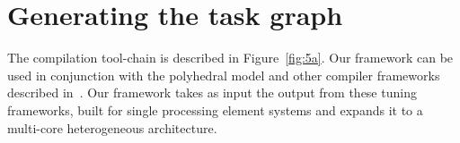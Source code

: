 \section{Generating the task graph}
\label{sec:gener-task-graph}

The compilation tool-chain is described in Figure~\ref{fig:5a}. Our
framework can be used in conjunction with the polyhedral model and other
compiler frameworks described in~\cite{atiw09,ubon08}.  Our framework
takes as input the output from these tuning frameworks, built for single
processing element systems and expands it to a multi-core heterogeneous
architecture.

\begin{figure}[t!]
  \centering
\end{figure}
